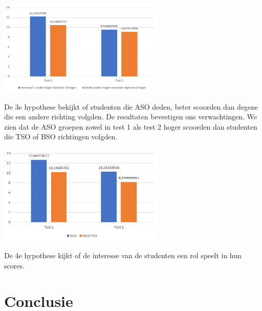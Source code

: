 \documentclass{voorstel}
\begin{document}
    \includegraphics[width=8cm]{img/univ.png}
    
    
    De 3e hypothese bekijkt of studenten die ASO deden, beter scoorden dan degene die een andere richting volgden. De resultaten bevestigen ons verwachtingen. We zien dat de ASO groepen zowel in test 1 als test 2 hoger scoorden dan studenten die TSO of BSO richtingen volgden.
    
    	\includegraphics[width=8cm]{img/aso.png}
    
    De 4e hypothese kijkt of de interesse van de studenten een rol speelt in hun scores.
        
    \section{Conclusie}
    \label{sec:conclusie}
	
	\printbibliography[heading=bibintoc]
	
\end{document}
